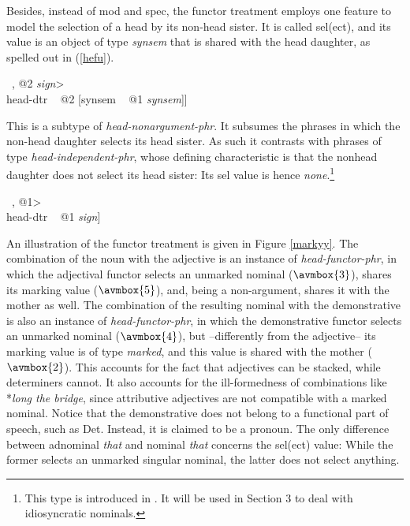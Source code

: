 \documentclass[output=paper]{langsci/langscibook}
\begin{document}
\noindent
Besides, instead of {\sc mod} and {\sc spec}, the functor treatment employs 
one feature to model the selection of a head by its non-head sister. It is   
called {\sc sel(ect)}, and its value is an object of type {\it synsem\/} that is 
shared with the head daughter, as spelled out in (\ref{hefu}).  

\begin{exe}
\ex\label{hefu} 
\begin{avm}
[{\it head-functor-phr\/}                     \\
 dtrs ~ <[synsem|loc|cat|head|sel ~ @1]~, @2 {\it sign\/}> \\
 head-dtr ~ @2 [synsem ~ @1 {\it synsem\/}]]
\end{avm}
\end{exe} 

\noindent
This is a subtype of {\it head-nonargument-phr}. It subsumes 
the phrases in which the non-head daughter selects its head sister.
As such it contrasts with phrases of type  
{\it head-independent-phr\/}, whose defining characteristic is 
that the nonhead daughter does not select its head sister: Its {\sc sel} value 
is hence {\it none}.\footnote{This type is introduced in 
\citet[130]{VanEynde98a}. It will be used in Section 3 to deal with 
idiosyncratic nominals.}   

\begin{exe}
\ex\label{hein} 
\begin{avm}
[{\it head-independent-phr\/}                           \\
 dtrs ~ <[synsem|loc|cat|head|sel ~ {\it none\/}]~, @1> \\
 head-dtr ~ @1 {\it sign\/}]
\end{avm}
\end{exe}    

An illustration of the functor treatment is given in Figure \ref{markyy}. 
The combination of the noun with the adjective is an instance of {\it head-functor-phr}, 
in which the adjectival functor selects an unmarked nominal ($\avmbox{3}$),  
shares its {\sc marking} value ($\avmbox{5}$), and, being a non-argument, 
shares it with the mother as well. 
The combination of the resulting nominal with the demonstrative is also 
an instance of {\it head-functor-phr},
in which the demonstrative functor selects an unmarked nominal ($\avmbox{4}$), 
but --differently from the adjective-- its {\sc marking} value is of type 
{\it marked}, and this value is shared with the mother ($\avmbox{2}$).    
This accounts for the fact that adjectives can be stacked, while  
determiners cannot. It also accounts for the ill-formedness of combinations like 
*{\it long the bridge}, since attributive adjectives are not compatible with a
marked nominal.  
Notice that the demonstrative does not belong to a functional part of speech, such as Det.
Instead, it is claimed to be a pronoun. The only difference between adnominal {\it that\/} and nominal
{\it that\/} concerns the {\sc sel(ect)} value: While the former selects an unmarked singular nominal, 
the latter does not select anything.      
\end{document}

